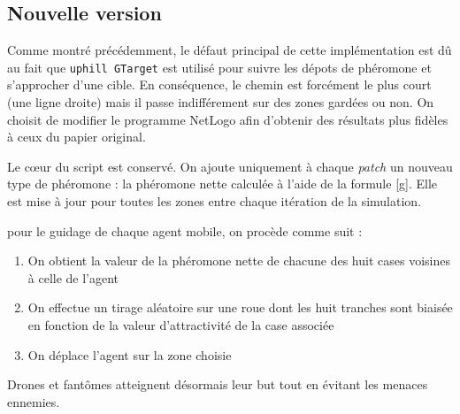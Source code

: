 \documentclass[12pt]{article}
\begin{document}
\subsection{Nouvelle version}

Comme montré précédemment, le défaut principal de cette implémentation
est dû au fait que \texttt{uphill GTarget} est utilisé pour suivre les
dépots de phéromone et s'approcher d'une cible. En conséquence, le
chemin est forcément le plus court (une ligne droite) mais il passe
indifférement sur des zones gardées ou non. On choisit de modifier le
programme NetLogo afin d'obtenir des résultats plus fidèles à ceux du
papier original.

Le c\oe ur du script est conservé. On ajoute uniquement à chaque
\textit{patch} un nouveau type de phéromone : la phéromone nette
calculée à l'aide de la formule \ref{g}. Elle est mise à jour pour
toutes les zones entre chaque itération de la simulation.

pour le guidage de chaque agent mobile, on procède comme suit :

\begin{enumerate}
  \item{On obtient la valeur de la phéromone nette de chacune des huit
  cases voisines à celle de l'agent}
  \item{On effectue un tirage aléatoire sur une roue dont les huit tranches
  sont biaisée en fonction de la valeur d'attractivité de la case
  associée}
  \item{On déplace l'agent sur la zone choisie}
\end{enumerate}

Drones et fantômes atteignent désormais leur but tout en évitant les
menaces ennemies.



\end{document}
